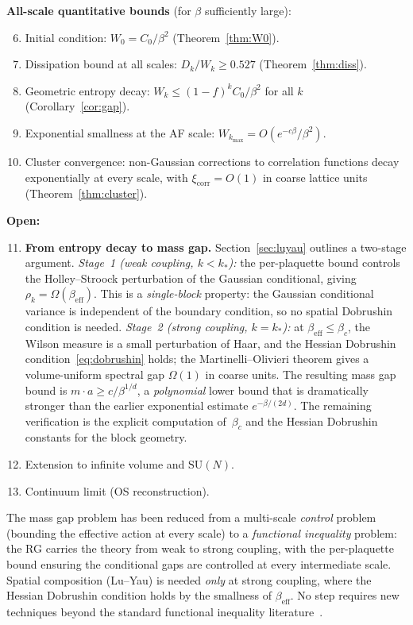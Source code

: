 \documentclass[11pt]{article}
\theoremstyle{definition}
\begin{document}
\textbf{All-scale quantitative bounds} (for $\beta$ sufficiently large):
\begin{enumerate}\setcounter{enumi}{5}
\item Initial condition: $W_0 = C_0/\beta^2$ (Theorem~\ref{thm:W0}).
\item Dissipation bound at all scales: $D_k/W_k \geq 0.527$ 
  (Theorem~\ref{thm:diss}).
\item Geometric entropy decay: 
  $W_k \leq (1-f)^k C_0/\beta^2$ for all $k$ (Corollary~\ref{cor:gap}).
\item Exponential smallness at the AF scale: 
  $W_{k_{\max}} = O(e^{-c\beta}/\beta^2)$.
\item Cluster convergence: non-Gaussian corrections to correlation 
  functions decay exponentially at every scale, with 
  $\xi_{\mathrm{corr}} = O(1)$ in coarse lattice units 
  (Theorem~\ref{thm:cluster}).
\end{enumerate}

\textbf{Open:}
\begin{enumerate}\setcounter{enumi}{10}
\item \textbf{From entropy decay to mass gap.}  
  Section~\ref{sec:luyau} outlines a two-stage argument.
  \emph{Stage~1 (weak coupling, $k < k_*$):} the per-plaquette bound 
  controls the Holley--Stroock perturbation of the Gaussian 
  conditional, giving $\rho_k = \Omega(\beta_{\mathrm{eff}})$.  
  This is a \emph{single-block} property: the Gaussian conditional 
  variance is independent of the boundary condition, so no spatial 
  Dobrushin condition is needed.  
  \emph{Stage~2 (strong coupling, $k = k_*$):} at 
  $\beta_{\mathrm{eff}} \leq \beta_c$, the Wilson measure is a small 
  perturbation of Haar, and the Hessian Dobrushin 
  condition~\eqref{eq:dobrushin} holds; the 
  Martinelli--Olivieri theorem gives a volume-uniform spectral gap 
  $\Omega(1)$ in coarse units.  The resulting mass gap bound is 
  $m \cdot a \geq c/\beta^{1/d}$, a \emph{polynomial} lower bound 
  that is dramatically stronger than the earlier exponential estimate 
  $e^{-\beta/(2d)}$.  The remaining verification is the explicit 
  computation of~$\beta_c$ and the Hessian Dobrushin constants 
  for the block geometry.
\item Extension to infinite volume and $\mathrm{SU}(N)$.
\item Continuum limit (OS reconstruction).
\end{enumerate}

The mass gap problem has been reduced from a multi-scale \emph{control} 
problem (bounding the effective action at every scale) to a 
\emph{functional inequality} problem: the RG carries the theory from 
weak to strong coupling, with the per-plaquette bound ensuring the 
conditional gaps are controlled at every intermediate scale.  Spatial 
composition (Lu--Yau) is needed \emph{only} at strong coupling, 
where the Hessian Dobrushin condition holds by the smallness of 
$\beta_{\mathrm{eff}}$.  No step requires new techniques beyond the 
standard functional inequality 
literature~\cite{BGL,lu_yau,martinelli_olivieri}.
\end{document}
